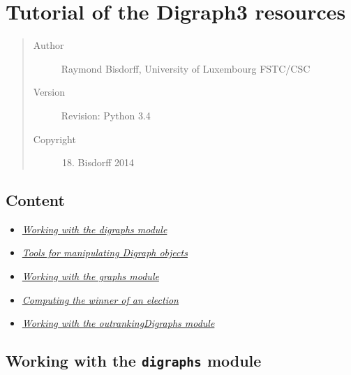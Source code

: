 \documentclass[letterpaper,10pt,english]{sphinxmanual}
\begin{document}
\section{Tutorial of the Digraph3 resources}
\label{tutorial::doc}\label{tutorial:tutorial-of-the-digraph3-resources}\begin{quote}\begin{description}
\item[{Author}] \leavevmode
Raymond Bisdorff, University of Luxembourg FSTC/CSC

\item[{Version}] \leavevmode
Revision: Python 3.4

\item[{Copyright}] \leavevmode\begin{enumerate}
\setcounter{enumi}{17}
\item {} 
Bisdorff 2014

\end{enumerate}

\end{description}\end{quote}


\subsection{Content}
\label{tutorial:content}\label{tutorial:tutorial-label}\begin{itemize}
\item {} 
{\hyperref[tutorial:digraphs-tutorial-label]{\emph{Working with the digraphs module}}}

\item {} 
{\hyperref[tutorial:digraph-tools-label]{\emph{Tools for manipulating Digraph objects}}}

\item {} 
{\hyperref[tutorial:graphs-tutorial-label]{\emph{Working with the graphs module}}}

\item {} 
{\hyperref[tutorial:linearvoting-label]{\emph{Computing the winner of an election}}}

\item {} 
{\hyperref[tutorial:outrankingdigraphs-tutorial-label]{\emph{Working with the outrankingDigraphs module}}}

\end{itemize}


\subsection{Working with the \texttt{digraphs} module}
\label{tutorial:working-with-the-digraphs-module}\label{tutorial:digraphs-tutorial-label}
\end{document}
